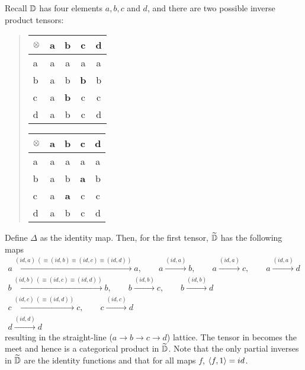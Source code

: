 Recall $\mathbb{D}$ has four elements $a,b,c$ and $d$, and there are two possible inverse product tensors:
\begin{quote}\qquad\qquad
  \begin{tabular}{|l||c|c|c|c|}
    \hline
    $\otimes$&a&b&c&d\\ \hline \hline
    a&a&a&a&a\\ \hline
    b&a&b&\textbf{b}&b\\ \hline
    c&a&\textbf{b}&c&c \\ \hline
    d&a&b&c&d \\ \hline
  \end{tabular}
  \hfil
  \begin{tabular}{|l||c|c|c|c|} \hline
    $\otimes$&a&b&c&d\\ \hline \hline
    a&a&a&a&a\\ \hline
    b&a&b&\textbf{a}&b\\ \hline
    c&a&\textbf{a}&c&c \\ \hline
    d&a&b&c&d \\ \hline
  \end{tabular}
  \qquad \qquad
\end{quote}


Define $\Delta$ as the identity map. Then, for the first tensor, $\widetilde{\mathbb{D}}$ has the following
maps
\begin{align*}
  a \xrightarrow{(id,a)\ (\equiv (id, b) \equiv (id,c) \equiv (id,d))} a, \qquad a
    \xrightarrow{(id,a)} b, \qquad a \xrightarrow{(id, a)} c , \qquad a \xrightarrow{(id, a)} d \\
  b \xrightarrow{(id,b) \ (\equiv (id, c) \equiv (id, d))} b , \qquad b \xrightarrow{(id,b)} c,
    \qquad b \xrightarrow{(id,b)} d\\
  c \xrightarrow{(id, c) \ (\equiv (id, d))} c ,   \qquad c \xrightarrow{(id,c)} d\\
  d \xrightarrow{(id,d)} d
\end{align*}
resulting in the straight-line ($a \to b \to c \to d$) lattice. The tensor in \D becomes the meet
and hence is a categorical product in $\widetilde{\mathbb{D}}$. Note that the only partial inverses in
$\widetilde{\mathbb{D}}$ are the identity functions and that for all maps $f$, $\langle f,1\rangle = id$.

